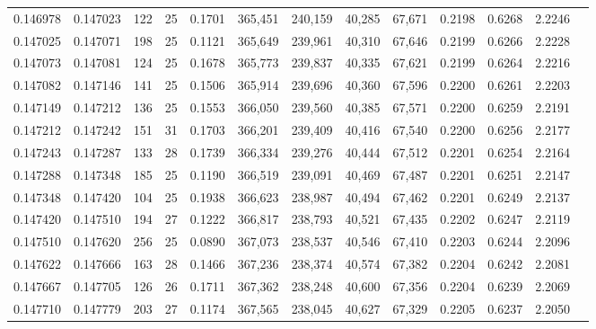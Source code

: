 \begin{tabular}{rrrrrrrrrrrrr}
0.146978 & 0.147023 & 122 &  25 &                                     0.1701 & 365,451 & 240,159 &  40,285 &  67,671 & 0.2198 & 0.6268 & 2.2246 \\
0.147025 & 0.147071 & 198 &  25 &                                     0.1121 & 365,649 & 239,961 &  40,310 &  67,646 & 0.2199 & 0.6266 & 2.2228 \\
0.147073 & 0.147081 & 124 &  25 &                                     0.1678 & 365,773 & 239,837 &  40,335 &  67,621 & 0.2199 & 0.6264 & 2.2216 \\
0.147082 & 0.147146 & 141 &  25 &                                     0.1506 & 365,914 & 239,696 &  40,360 &  67,596 & 0.2200 & 0.6261 & 2.2203 \\
0.147149 & 0.147212 & 136 &  25 &                                     0.1553 & 366,050 & 239,560 &  40,385 &  67,571 & 0.2200 & 0.6259 & 2.2191 \\
0.147212 & 0.147242 & 151 &  31 &                                     0.1703 & 366,201 & 239,409 &  40,416 &  67,540 & 0.2200 & 0.6256 & 2.2177 \\
0.147243 & 0.147287 & 133 &  28 &                                     0.1739 & 366,334 & 239,276 &  40,444 &  67,512 & 0.2201 & 0.6254 & 2.2164 \\
0.147288 & 0.147348 & 185 &  25 &                                     0.1190 & 366,519 & 239,091 &  40,469 &  67,487 & 0.2201 & 0.6251 & 2.2147 \\
0.147348 & 0.147420 & 104 &  25 &                                     0.1938 & 366,623 & 238,987 &  40,494 &  67,462 & 0.2201 & 0.6249 & 2.2137 \\
0.147420 & 0.147510 & 194 &  27 &                                     0.1222 & 366,817 & 238,793 &  40,521 &  67,435 & 0.2202 & 0.6247 & 2.2119 \\
0.147510 & 0.147620 & 256 &  25 &                                     0.0890 & 367,073 & 238,537 &  40,546 &  67,410 & 0.2203 & 0.6244 & 2.2096 \\
0.147622 & 0.147666 & 163 &  28 &                                     0.1466 & 367,236 & 238,374 &  40,574 &  67,382 & 0.2204 & 0.6242 & 2.2081 \\
0.147667 & 0.147705 & 126 &  26 &                                     0.1711 & 367,362 & 238,248 &  40,600 &  67,356 & 0.2204 & 0.6239 & 2.2069 \\
0.147710 & 0.147779 & 203 &  27 &                                     0.1174 & 367,565 & 238,045 &  40,627 &  67,329 & 0.2205 & 0.6237 & 2.2050 \\

\end{tabular}
